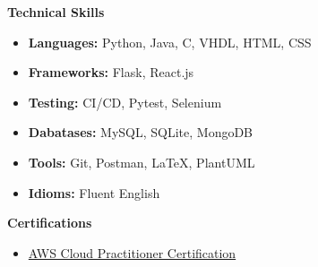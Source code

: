 \documentclass[a4paper,10pt]{article}
\newcommand{\heading}[1]{\noindent\textbf{\Large{#1}}}
\begin{document}
\vspace{0.5cm}

\heading{Technical Skills}
\begin{itemize}[noitemsep]
    \item \textbf{Languages:} Python, Java, C, VHDL, HTML, CSS
    \item \textbf{Frameworks:} Flask, React.js
    \item \textbf{Testing:} CI/CD, Pytest, Selenium
    \item \textbf{Dabatases:} MySQL, SQLite, MongoDB
    \item \textbf{Tools:} Git, Postman, LaTeX, PlantUML
    \item \textbf{Idioms:} Fluent English
\end{itemize}

\vspace{0.5cm}


\heading{Certifications}
\begin{itemize}[noitemsep]
    \item \href{https://www.credly.com/badges/fe74fb6a-74be-44ed-be9a-71f450ec811a/linked_in_profile}{AWS Cloud Practitioner Certification}
\end{itemize}
\end{document}
